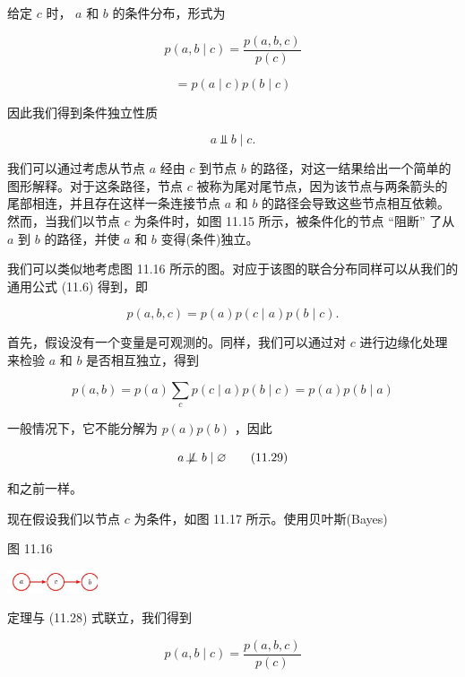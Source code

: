 \documentclass[10pt]{report}
\begin{document}
给定 \(c\) 时， \(a\) 和 \(b\) 的条件分布，形式为

\[
p\left( {a,b \mid  c}\right)  = \frac{p\left( {a,b,c}\right) }{p\left( c\right) }
\]

\[
= p\left( {a \mid  c}\right) p\left( {b \mid  c}\right)
\]

因此我们得到条件独立性质

\[
a ⫫ b \mid  c.
\]

我们可以通过考虑从节点 \(a\) 经由 \(c\) 到节点 \(b\) 的路径，对这一结果给出一个简单的图形解释。对于这条路径，节点 \(c\) 被称为尾对尾节点，因为该节点与两条箭头的尾部相连，并且存在这样一条连接节点 \(a\) 和 \(b\) 的路径会导致这些节点相互依赖。然而，当我们以节点 \(c\) 为条件时，如图 11.15 所示，被条件化的节点 “阻断” 了从 \(a\) 到 \(b\) 的路径，并使 \(a\) 和 \(b\) 变得(条件)独立。

我们可以类似地考虑图 11.16 所示的图。对应于该图的联合分布同样可以从我们的通用公式 (11.6) 得到，即

\[
p\left( {a,b,c}\right)  = p\left( a\right) p\left( {c \mid  a}\right) p\left( {b \mid  c}\right) . \tag{11.28}
\]

首先，假设没有一个变量是可观测的。同样，我们可以通过对 \(c\) 进行边缘化处理来检验 \(a\) 和 \(b\) 是否相互独立，得到

\[
p\left( {a,b}\right)  = p\left( a\right) \mathop{\sum }\limits_{c}p\left( {c \mid  a}\right) p\left( {b \mid  c}\right)  = p\left( a\right) p\left( {b \mid  a}\right)
\]

一般情况下，它不能分解为 \(p\left( a\right) p\left( b\right)\) ，因此

\[
a \mathrel{ \not \! \perp \!\!\! \perp } b \mid  \varnothing  \tag{11.29}
\]

和之前一样。

现在假设我们以节点 \(c\) 为条件，如图 11.17 所示。使用贝叶斯(Bayes)

图 11.16

\begin{center}
\includegraphics[max width=0.2\textwidth]{images/0194e279-9b28-703a-88f4-c3ac21e2010d_358_1198_1804_343_84_0.jpg}
\end{center}
\hspace*{3em} 

定理与 (11.28) 式联立，我们得到

\[
p\left( {a,b \mid  c}\right)  = \frac{p\left( {a,b,c}\right) }{p\left( c\right) }
\]
\end{document}
